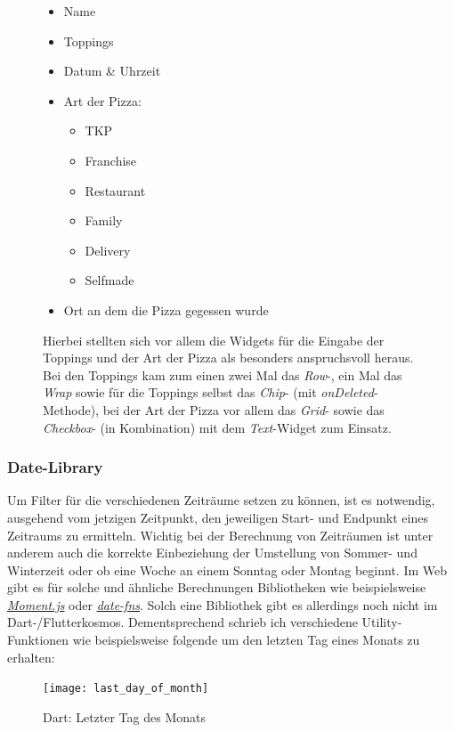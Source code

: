 \begin{figure}[H]
        \begin{itemize}
            \itemsep-0.4em
            \item Name
            \item Toppings
            \item Datum \& Uhrzeit
            \item Art der Pizza:
            \begin{itemize}
                \itemsep-0.4em
                \item \ac{TKP}
                \item Franchise
                \item Restaurant
                \item Family
                \item Delivery
                \item Selfmade
            \end{itemize}
            \item Ort an dem die Pizza gegessen wurde
        \end{itemize}

        Hierbei stellten sich vor allem die Widgets für die
        Eingabe der Toppings und der Art der Pizza als besonders
        anspruchsvoll heraus. Bei den Toppings kam zum einen
        zwei Mal das \textit{Row}-, ein Mal das \textit{Wrap}
        sowie für die Toppings selbst das \textit{Chip}-
        (mit \textit{onDeleted}-Methode), bei der
        Art der Pizza vor allem das \textit{Grid}- sowie
        das \textit{Checkbox}- (in Kombination) mit dem \textit{Text}-Widget
        zum Einsatz.

    \endminipage\hfill
\end{figure}



\subsubsection{Date-Library}

Um Filter für die verschiedenen Zeiträume setzen zu können,
ist es notwendig, ausgehend vom jetzigen Zeitpunkt,
den jeweiligen Start- und Endpunkt eines Zeitraums zu ermitteln.
Wichtig bei der Berechnung von Zeiträumen ist unter anderem auch
die korrekte Einbeziehung der Umstellung von Sommer- und Winterzeit
oder ob eine Woche an einem Sonntag oder Montag beginnt.
Im Web gibt es für solche und ähnliche Berechnungen Bibliotheken
wie beispielsweise \href{https://momentjs.com/docs/}{\textit{Moment.js}}
oder \href{https://date-fns.org/}{\textit{date-fns}}.
Solch eine Bibliothek gibt es allerdings noch nicht im Dart-/Flutterkosmos.
Dementsprechend schrieb ich verschiedene Utility-Funktionen wie
beispielsweise folgende um den letzten Tag eines Monats zu erhalten:
\begin{figure}[H]
    \centering
    \texttt{[image: last\_day\_of\_month]}
    \caption{Dart: Letzter Tag des Monats}
\end{figure}

